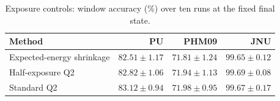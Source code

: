 \begin{table}[pos=htbp]
\centering\small
\caption{Exposure controls: window accuracy (\%) over ten runs at the fixed final state.}
\label{tab:exposure}
\begin{tabular}{lrrr}
\toprule
Method & PU & PHM09 & JNU\\
\midrule
Expected-energy shrinkage & $82.51\pm1.17$ & $71.81\pm1.24$ & $99.65\pm0.12$\\
Half-exposure Q2 & $82.82\pm1.06$ & $71.94\pm1.13$ & $99.69\pm0.08$\\
Standard Q2 & $83.12\pm0.94$ & $71.98\pm0.95$ & $99.67\pm0.17$\\
\bottomrule
\end{tabular}
\end{table}
